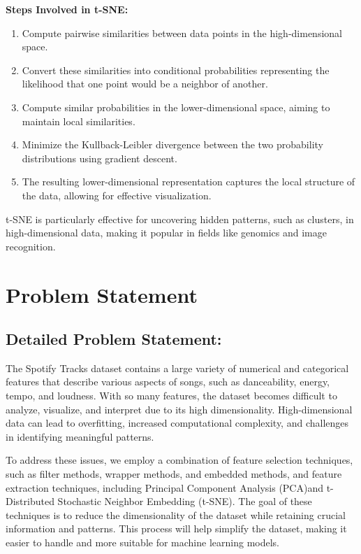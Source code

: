 \documentclass{article}
\begin{document}
\textbf{Steps Involved in t-SNE:}
\begin{enumerate}
    \item Compute pairwise similarities between data points in the high-dimensional space.
    \item Convert these similarities into conditional probabilities representing the likelihood that one point would be a neighbor of another.
    \item Compute similar probabilities in the lower-dimensional space, aiming to maintain local similarities.
    \item Minimize the Kullback-Leibler divergence between the two probability distributions using gradient descent.
    \item The resulting lower-dimensional representation captures the local structure of the data, allowing for effective visualization.
\end{enumerate}

t-SNE is particularly effective for uncovering hidden patterns, such as clusters, in high-dimensional data, making it popular in fields like genomics and image recognition.

\section{Problem Statement}

\subsection{Detailed Problem Statement:}
The Spotify Tracks dataset contains a large variety of numerical and categorical features that describe various aspects of songs, such as danceability, energy, tempo, and loudness. With so many features, the dataset becomes difficult to analyze, visualize, and interpret due to its high dimensionality. High-dimensional data can lead to overfitting, increased computational complexity, and challenges in identifying meaningful patterns. 

To address these issues, we employ a combination of {feature selection} techniques, such as filter methods, wrapper methods, and embedded methods, and {feature extraction} techniques, including Principal Component Analysis (PCA)and t-Distributed Stochastic Neighbor Embedding (t-SNE). The goal of these techniques is to reduce the dimensionality of the dataset while retaining crucial information and patterns. This process will help simplify the dataset, making it easier to handle and more suitable for machine learning models.
\end{document}
